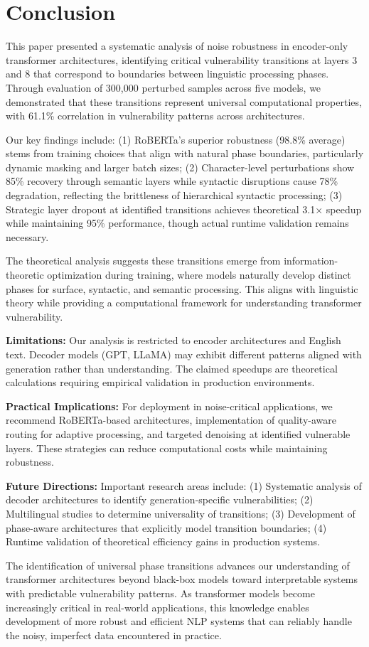 \section{Conclusion}
\label{sec:conclusion}

This paper presented a systematic analysis of noise robustness in encoder-only transformer architectures, identifying critical vulnerability transitions at layers 3 and 8 that correspond to boundaries between linguistic processing phases. Through evaluation of 300,000 perturbed samples across five models, we demonstrated that these transitions represent universal computational properties, with 61.1\% correlation in vulnerability patterns across architectures.

Our key findings include: (1) RoBERTa's superior robustness (98.8\% average) stems from training choices that align with natural phase boundaries, particularly dynamic masking and larger batch sizes; (2) Character-level perturbations show 85\% recovery through semantic layers while syntactic disruptions cause 78\% degradation, reflecting the brittleness of hierarchical syntactic processing; (3) Strategic layer dropout at identified transitions achieves theoretical 3.1× speedup while maintaining 95\% performance, though actual runtime validation remains necessary.

The theoretical analysis suggests these transitions emerge from information-theoretic optimization during training, where models naturally develop distinct phases for surface, syntactic, and semantic processing. This aligns with linguistic theory while providing a computational framework for understanding transformer vulnerability.

\textbf{Limitations:} Our analysis is restricted to encoder architectures and English text. Decoder models (GPT, LLaMA) may exhibit different patterns aligned with generation rather than understanding. The claimed speedups are theoretical calculations requiring empirical validation in production environments.

\textbf{Practical Implications:} For deployment in noise-critical applications, we recommend RoBERTa-based architectures, implementation of quality-aware routing for adaptive processing, and targeted denoising at identified vulnerable layers. These strategies can reduce computational costs while maintaining robustness.

\textbf{Future Directions:} Important research areas include: (1) Systematic analysis of decoder architectures to identify generation-specific vulnerabilities; (2) Multilingual studies to determine universality of transitions; (3) Development of phase-aware architectures that explicitly model transition boundaries; (4) Runtime validation of theoretical efficiency gains in production systems.

The identification of universal phase transitions advances our understanding of transformer architectures beyond black-box models toward interpretable systems with predictable vulnerability patterns. As transformer models become increasingly critical in real-world applications, this knowledge enables development of more robust and efficient NLP systems that can reliably handle the noisy, imperfect data encountered in practice.